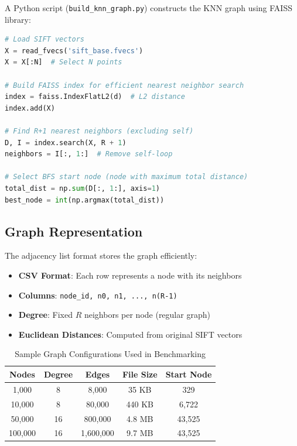 \documentclass[11pt,a4paper]{article}
\begin{document}
A Python script (\texttt{build\_knn\_graph.py}) constructs the KNN graph using FAISS library:

\begin{lstlisting}[language=Python,caption={KNN Graph Construction Process}]
# Load SIFT vectors
X = read_fvecs('sift_base.fvecs')
X = X[:N]  # Select N points

# Build FAISS index for efficient nearest neighbor search
index = faiss.IndexFlatL2(d)  # L2 distance
index.add(X)

# Find R+1 nearest neighbors (excluding self)
D, I = index.search(X, R + 1)
neighbors = I[:, 1:]  # Remove self-loop

# Select BFS start node (node with maximum total distance)
total_dist = np.sum(D[:, 1:], axis=1)
best_node = int(np.argmax(total_dist))
\end{lstlisting}

\subsection{Graph Representation}

The adjacency list format stores the graph efficiently:

\begin{itemize}
    \item \textbf{CSV Format}: Each row represents a node with its neighbors
    \item \textbf{Columns}: \texttt{node\_id, n0, n1, ..., n(R-1)}
    \item \textbf{Degree}: Fixed $R$ neighbors per node (regular graph)
    \item \textbf{Euclidean Distances}: Computed from original SIFT vectors
\end{itemize}

\begin{table}[H]
\centering
\caption{Sample Graph Configurations Used in Benchmarking}
\begin{tabular}{@{}ccccc@{}}
\toprule
\textbf{Nodes} & \textbf{Degree} & \textbf{Edges} & \textbf{File Size} & \textbf{Start Node} \\ \midrule
1,000          & 8               & 8,000          & 35 KB              & 329                 \\
10,000         & 8               & 80,000         & 440 KB             & 6,722               \\
50,000         & 16              & 800,000        & 4.8 MB             & 43,525              \\
100,000        & 16              & 1,600,000      & 9.7 MB             & 43,525              \\
\bottomrule
\end{tabular}
\end{table}
\end{document}
